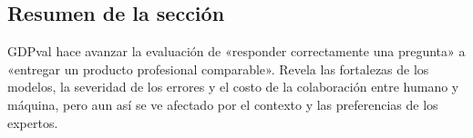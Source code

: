 \subsection{Resumen de la sección}

GDPval hace avanzar la evaluación de «responder correctamente una pregunta» a «entregar un producto profesional comparable». Revela las fortalezas de los modelos, la severidad de los errores y el costo de la colaboración entre humano y máquina, pero aun así se ve afectado por el contexto y las preferencias de los expertos.

